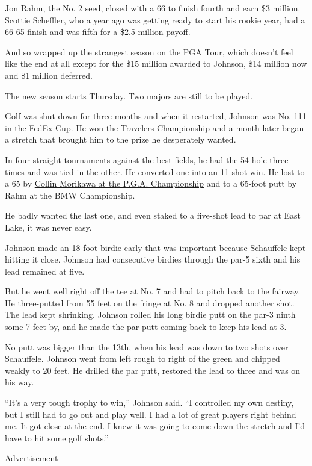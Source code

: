 Jon Rahm, the No. 2 seed, closed with a 66 to finish fourth and earn \$3
million. Scottie Scheffler, who a year ago was getting ready to start
his rookie year, had a 66-65 finish and was fifth for a \$2.5 million
payoff.

And so wrapped up the strangest season on the PGA Tour, which doesn't
feel like the end at all except for the \$15 million awarded to Johnson,
\$14 million now and \$1 million deferred.

The new season starts Thursday. Two majors are still to be played.

Golf was shut down for three months and when it restarted, Johnson was
No. 111 in the FedEx Cup. He won the Travelers Championship and a month
later began a stretch that brought him to the prize he desperately
wanted.

In four straight tournaments against the best fields, he had the 54-hole
three times and was tied in the other. He converted one into an 11-shot
win. He lost to a 65 by
\href{https://www.nytimes3xbfgragh.onion/2020/08/08/sports/golf/pga-championship-dustin-johnson.html}{Collin
Morikawa at the P.G.A. Championship} and to a 65-foot putt by Rahm at
the BMW Championship.

He badly wanted the last one, and even staked to a five-shot lead to par
at East Lake, it was never easy.

Johnson made an 18-foot birdie early that was important because
Schauffele kept hitting it close. Johnson had consecutive birdies
through the par-5 sixth and his lead remained at five.

But he went well right off the tee at No. 7 and had to pitch back to the
fairway. He three-putted from 55 feet on the fringe at No. 8 and dropped
another shot. The lead kept shrinking. Johnson rolled his long birdie
putt on the par-3 ninth some 7 feet by, and he made the par putt coming
back to keep his lead at 3.

No putt was bigger than the 13th, when his lead was down to two shots
over Schauffele. Johnson went from left rough to right of the green and
chipped weakly to 20 feet. He drilled the par putt, restored the lead to
three and was on his way.

``It's a very tough trophy to win,'' Johnson said. ``I controlled my own
destiny, but I still had to go out and play well. I had a lot of great
players right behind me. It got close at the end. I knew it was going to
come down the stretch and I'd have to hit some golf shots.''

Advertisement

